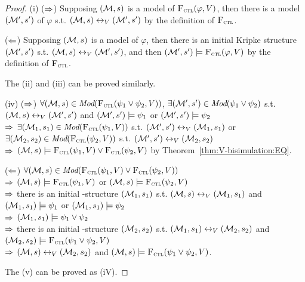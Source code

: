 \documentclass{article}
\begin{document}
\begin{proof}
(i) ($\Rightarrow$) Supposing $({\cal M}, s)$ is a model of ${\textsc{F}_{\textsc{ctl}}}(\varphi, V)$, then there is a model $({\cal M}',s')$ of $\varphi$ s.t. $({\cal M},s) \leftrightarrow_V ({\cal M}',s')$ by the definition of ${\textsc{F}_{\textsc{ctl}}}$.

($\Leftarrow$) Supposing $({\cal M}, s)$ is a model of $\varphi$, then there is an initial Kripke structure $({\cal M}',s')$ s.t. $({\cal M},s) \leftrightarrow_V ({\cal M}',s')$, and then $({\cal M}',s') \models {\textsc{F}_{\textsc{ctl}}}(\varphi, V)$ by the definition of ${\textsc{F}_{\textsc{ctl}}}$.

The (ii) and (iii) can be proved similarly.

(iv) ($\Rightarrow$) $\forall ({\cal M},s) \in \textit{Mod}({\textsc{F}_{\textsc{ctl}}}(\psi_1 \vee \psi_2, V))$, $\exists ({\cal M}',s') \in \textit{Mod}(\psi_1\vee \psi_2)$ s.t. $({\cal M},s) \leftrightarrow_V ({\cal M}',s')$ and $({\cal M}',s') \models \psi_1$ or $({\cal M}',s') \models \psi_2$ \\
$\Rightarrow$ $\exists ({\cal M}_1,s_1) \in \textit{Mod}({\textsc{F}_{\textsc{ctl}}}(\psi_1, V))$ s.t. $({\cal M}',s') \leftrightarrow_V ({\cal M}_1,s_1)$ or $\exists ({\cal M}_2,s_2) \in \textit{Mod}({\textsc{F}_{\textsc{ctl}}}(\psi_2, V))$ s.t. $({\cal M}',s') \leftrightarrow_V ({\cal M}_2,s_2)$ \\
$\Rightarrow$ $({\cal M},s) \models {\textsc{F}_{\textsc{ctl}}}(\psi_1, V) \vee {\textsc{F}_{\textsc{ctl}}}(\psi_2, V)$ by Theorem~\ref{thm:V-bisimulation:EQ}.

($\Leftarrow$) $\forall ({\cal M},s) \in \textit{Mod}({\textsc{F}_{\textsc{ctl}}}(\psi_1, V) \vee {\textsc{F}_{\textsc{ctl}}}(\psi_2, V))$\\
$\Rightarrow$ $({\cal M},s) \models {\textsc{F}_{\textsc{ctl}}}(\psi_1,V)$ or $({\cal M},s) \models {\textsc{F}_{\textsc{ctl}}}(\psi_2,V)$\\
$\Rightarrow$ there is an initial \MPK-structure $({\cal M}_1,s_1)$ s.t. $({\cal M},s) \leftrightarrow_V ({\cal M}_1,s_1)$ and $({\cal M}_1,s_1) \models \psi_1$ or  $({\cal M}_1,s_1) \models \psi_2$\\
$\Rightarrow$ $({\cal M}_1,s_1) \models \psi_1 \vee \psi_2$\\
$\Rightarrow$ there is an initial \MPK-structure $({\cal M}_2,s_2)$ s.t. $({\cal M}_1,s_1) \leftrightarrow_V ({\cal M}_2,s_2)$ and $({\cal M}_2,s_2) \models {\textsc{F}_{\textsc{ctl}}}(\psi_1 \vee \psi_2, V)$\\
$\Rightarrow$ $({\cal M},s) \leftrightarrow_V ({\cal M}_2,s_2)$ and $({\cal M},s) \models {\textsc{F}_{\textsc{ctl}}}(\psi_1 \vee \psi_2, V)$.

The (v) can be proved as (iV).
\end{proof}
\end{document}
